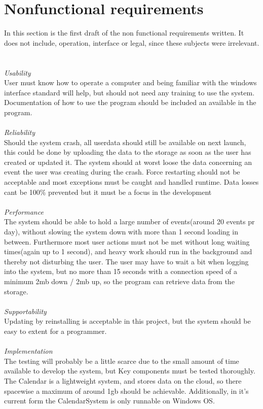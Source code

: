 \section{Nonfunctional requirements}

In this section is the first draft of the non functional requirements written. It does not include, operation, interface or legal, since these subjects were irrelevant.
\\ 
\\
\HRule \\[0.4cm]
\emph{Usability} \\ 
User must know how to operate a computer and being familiar with the windows interface standard will help, but should not need any training to use the system. Documentation of how to use the program should be included an available in the program. \\
\HRule \\[0.4cm]
\emph{Reliability} \\
Should the system crash, all userdata should still be available on next launch, this could be done by uploading the data to the storage as soon as the user has created or updated it. The system should at worst loose the data concerning an event the user was creating during the crash. Force restarting should not be acceptable and most exceptions must be caught and handled runtime. Data losses cant be 100\% prevented but it must be a focus in the development\\
\HRule \\[0.4cm]
\emph{Performance} \\
The system should be able to hold a large number of events(around 20 events pr day), without slowing the system down with more than 1 second loading in between. Furthermore most user actions must not be met without long waiting times(again up to 1 second), and heavy work should run in the background and thereby not disturbing the user.  The user may have to wait a bit when logging into the system, but no more than 15 seconds with a connection speed of a minimum 2mb down / 2mb up, so the program can retrieve data from the storage. \\
\HRule \\[0.4cm]
\emph{Supportability} \\
Updating by reinstalling is acceptable in this project, but the system should be easy to extent for a programmer.\\
\HRule \\[0.4cm]
\emph{Implementation}\\
The testing will probably be a little scarce due to the small amount of time available to develop the system, but Key components must be tested thoroughly.  The Calendar is a lightweight system, and stores data on the cloud, so there spacewise a maximum of around 1gb should be achievable. Additionally, in it's current form the CalendarSystem is only runnable on Windows OS.\\
\HRule \\[0.4cm]

\newpage